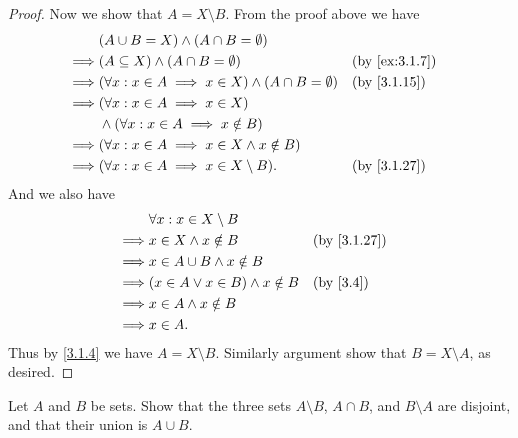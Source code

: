 \begin{proof}
  Now we show that \(A = X \setminus B\).
  From the proof above we have
  \begin{align*}
             & (A \cup B = X) \land (A \cap B = \emptyset)                                            \\
    \implies & (A \subseteq X) \land (A \cap B = \emptyset)                        &  & \by{ex:3.1.7} \\
    \implies & (\forall x : x \in A \implies x \in X) \land (A \cap B = \emptyset) &  & \by{3.1.15}   \\
    \implies & (\forall x : x \in A \implies x \in X)                                                 \\
             & \land (\forall x : x \in A \implies x \notin B)                                        \\
    \implies & (\forall x : x \in A \implies x \in X \land x \notin B)                                \\
    \implies & (\forall x : x \in A \implies x \in X \setminus B).                 &  & \by{3.1.27}
  \end{align*}
  And we also have
  \begin{align*}
             & \forall x : x \in X \setminus B                                     \\
    \implies & x \in X \land x \notin B                &  & \by{3.1.27}            \\
    \implies & x \in A \cup B \land x \notin B                                     \\
    \implies & (x \in A \lor x \in B) \land x \notin B &  & \text{(by \cref{3.4})} \\
    \implies & x \in A \land x \notin B                                            \\
    \implies & x \in A.
  \end{align*}
  Thus by \cref{3.1.4} we have \(A = X \setminus B\).
  Similarly argument show that \(B = X \setminus A\), as desired.
\end{proof}

\begin{ex}\label{ex:3.1.10}
  Let \(A\) and \(B\) be sets.
  Show that the three sets \(A \setminus B\), \(A \cap B\), and \(B \setminus A\) are disjoint, and that their union is \(A \cup B\).
\end{ex}

